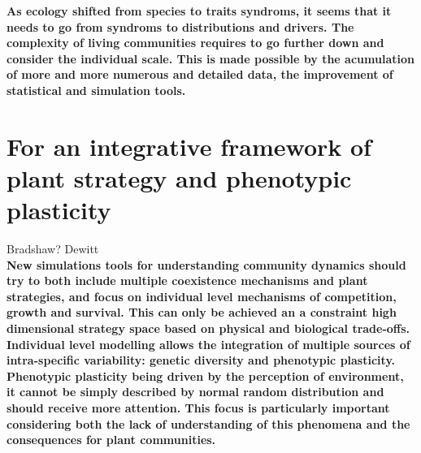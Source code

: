 \textbf{As ecology shifted from species to traits syndroms, it seems that it needs to go from syndroms to distributions and drivers. The complexity of living communities requires to go further down and consider the individual scale. This is made possible by the acumulation of more and more numerous and detailed data, the improvement of statistical and simulation tools. }

\section{For an integrative framework of plant strategy and phenotypic plasticity}

Bradshaw?
Dewitt\\

\textbf{New simulations tools for understanding community dynamics should try to both include multiple coexistence mechanisms and plant strategies, and focus on individual level mechanisms of competition, growth and survival. This can only be achieved an a constraint high dimensional strategy space based on physical and biological trade-offs. Individual level modelling allows the integration of multiple sources of intra-specific variability: genetic diversity and phenotypic plasticity. Phenotypic plasticity being driven by the perception of environment, it cannot be simply described by normal random distribution and should receive more attention. This focus is particularly important considering both the lack of understanding of this phenomena and the consequences for plant communities.  }


